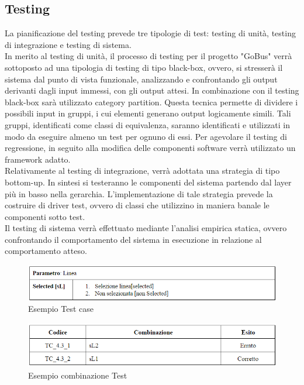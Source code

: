 \subsection{Testing}
La pianificazione del testing prevede tre tipologie di test: testing di unit\`{a}, testing di integrazione e testing di sistema.\\
In merito al testing di unit\`{a}, il processo di testing per il progetto "GoBus" verr\`{a} sottoposto ad una tipologia di testing di tipo black-box, ovvero, si stresser\`{a} il sistema dal punto di vista funzionale, analizzando e confrontando gli output derivanti dagli input immessi, con gli output attesi. In combinazione con il testing black-box sar\`{a} utilizzato category partition. Questa tecnica permette di dividere i possibili input in gruppi, i cui elementi generano output logicamente simili. Tali gruppi, identificati come classi di equivalenza, saranno identificati e utilizzati in modo da eseguire almeno un test per ognuno di essi. Per agevolare il testing di regressione, in seguito alla modifica delle componenti software verr\`{a} utilizzato un framework adatto.\\
Relativamente al testing di integrazione, verr\`{a} adottata una strategia di tipo bottom-up. In sintesi si testeranno le componenti del sistema partendo dal layer pi\`{u} in basso nella gerarchia. L\rq implementazione di tale strategia prevede la costruire di driver test, ovvero di classi che utilizzino in maniera banale le componenti sotto test.\\
Il testing di sistema verr\`{a} effettuato mediante l\rq analisi empirica statica, ovvero confrontando il comportamento del sistema in esecuzione in relazione al comportamento atteso.\\

\begin{figure}[h]
\centering
\includegraphics[scale=.6]{img/21.png}
\caption{Esempio Test case }
\label{fig:mhs}
\end{figure}  

\begin{figure}[h]
\centering
\includegraphics[scale=.6]{img/22.png}
\caption{Esempio combinazione Test}
\label{fig:mhs}
\end{figure} 

